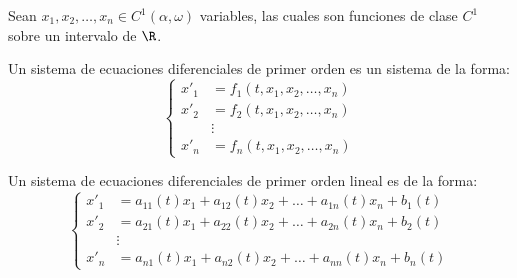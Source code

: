 \documentclass[../main.tex]{subfiles}
\begin{document}
Sean \(x_1, x_2, \dots, x_n \in C^1(\alpha, \omega)\) variables, las cuales son
funciones de clase \(C^1\) sobre un intervalo de \(\R\).

\begin{definition}
	Un sistema de ecuaciones diferenciales de primer orden es un sistema de la
	forma:
	\[\begin{cases}
			x'_1 &= f_1(t, x_1, x_2, \dots, x_n) \\
			x'_2 &= f_2(t, x_1, x_2, \dots, x_n) \\
				 &\vdots \\
			x'_n &= f_n(t, x_1, x_2, \dots, x_n)
	  \end{cases}\]
\end{definition}

\begin{definition}
	Un sistema de ecuaciones diferenciales de primer orden lineal es de la
	forma:
	\[\begin{cases}
		x'_1 &= a_{11}(t)x_1 + a_{12}(t)x_2 + \dots + a_{1n}(t)x_n + b_1(t) \\
		x'_2 &= a_{21}(t)x_1 + a_{22}(t)x_2 + \dots + a_{2n}(t)x_n + b_2(t) \\
			 &\vdots \\
		x'_n &= a_{n1}(t)x_1 + a_{n2}(t)x_2 + \dots + a_{nn}(t)x_n + b_n(t)
	  \end{cases}\]
\end{definition}
\end{document}
